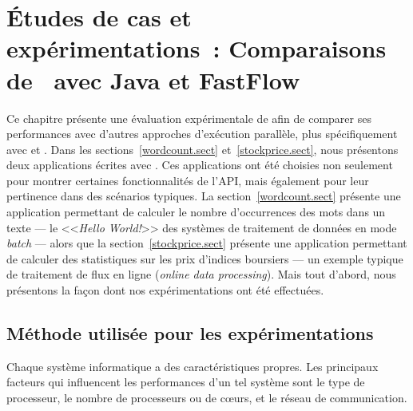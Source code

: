 
\chapter{\'Etudes de cas et exp\'erimentations~: Comparaisons de \ppff\ avec Java et FastFlow}
\label{experiences.chap}


Ce chapitre pr\'esente une \'evaluation exp\'erimentale de  afin de comparer ses performances avec d'autres approches d'ex\'ecution parall\`ele, plus sp\'ecifiquement avec  et .
%
Dans les sections~\ref{wordcount.sect} et~\ref{stockprice.sect}, nous pr\'esentons deux applications \'ecrites avec \PpFf. Ces applications ont \'et\'e choisies non seulement pour montrer certaines fonctionnalit\'es de l'API, mais \'egalement pour leur pertinence dans des sc\'enarios typiques. La section~\ref{wordcount.sect} pr\'esente une application permettant de calculer le nombre d'occurrences des mots dans un texte --- le <<\emph{Hello World!}>> des syst\`emes de traitement de donn\'ees en mode \emph{batch} --- alors que la section~\ref{stockprice.sect} pr\'esente une application permettant de calculer des statistiques sur les prix d'indices boursiers --- un exemple typique de traitement de flux en ligne (\emph{online data processing}).
%
%
Mais tout d'abord, nous pr\'esentons la fa\c{c}on dont nos
exp\'erimentations ont \'et\'e effectu\'ees.

\section{M\'ethode utilis\'ee pour les exp\'erimentations}
\label{usedMethodsForBenchmarks.chap}

Chaque syst\`eme informatique a des caract\'eristiques propres. Les principaux facteurs qui influencent les performances d'un tel syst\`eme sont le type de processeur, le nombre de processeurs ou de c\oe{}urs, et le r\'eseau de communication. 




